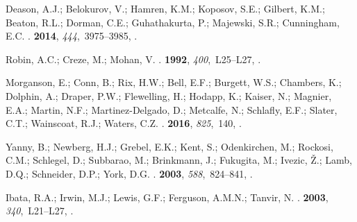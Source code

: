 \begin{thebibliography}{-------}
{Deason}, A.J.; {Belokurov}, V.; {Hamren}, K.M.; {Koposov}, S.E.; {Gilbert},
  K.M.; {Beaton}, R.L.; {Dorman}, C.E.; {Guhathakurta}, P.; {Majewski}, S.R.;
  {Cunningham}, E.C.
.
 {\bf 2014}, {\em 444},~3975--3985,
  \href{http://xxx.lanl.gov/abs/1407.4458}{{\normalfont [1407.4458]}}.

{Robin}, A.C.; {Creze}, M.; {Mohan}, V.
.
 {\bf 1992}, {\em 400},~L25--L27,
  \href{http://xxx.lanl.gov/abs/astro-ph/9210001}{{\normalfont
  [astro-ph/9210001]}}.

{Morganson}, E.; {Conn}, B.; {Rix}, H.W.; {Bell}, E.F.; {Burgett}, W.S.;
  {Chambers}, K.; {Dolphin}, A.; {Draper}, P.W.; {Flewelling}, H.; {Hodapp},
  K.; {Kaiser}, N.; {Magnier}, E.A.; {Martin}, N.F.; {Martinez-Delgado}, D.;
  {Metcalfe}, N.; {Schlafly}, E.F.; {Slater}, C.T.; {Wainscoat}, R.J.;
  {Waters}, C.Z.
.
 {\bf 2016}, {\em 825},~140,
  \href{http://xxx.lanl.gov/abs/1604.07501}{{\normalfont [1604.07501]}}.

{Yanny}, B.; {Newberg}, H.J.; {Grebel}, E.K.; {Kent}, S.; {Odenkirchen}, M.;
  {Rockosi}, C.M.; {Schlegel}, D.; {Subbarao}, M.; {Brinkmann}, J.; {Fukugita},
  M.; {Ivezic}, {\v Z}.; {Lamb}, D.Q.; {Schneider}, D.P.; {York}, D.G.
.
 {\bf 2003}, {\em 588},~824--841,
  \href{http://xxx.lanl.gov/abs/astro-ph/0301029}{{\normalfont
  [astro-ph/0301029]}}.

{Ibata}, R.A.; {Irwin}, M.J.; {Lewis}, G.F.; {Ferguson}, A.M.N.; {Tanvir}, N.
.
 {\bf 2003}, {\em 340},~L21--L27,
  \href{http://xxx.lanl.gov/abs/astro-ph/0301067}{{\normalfont
  [astro-ph/0301067]}}.


\end{thebibliography}
